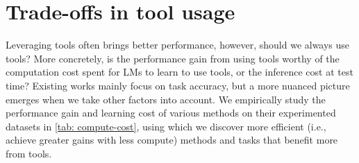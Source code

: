 \section{Trade-offs in tool usage}
\label{sub:trade-off}

Leveraging tools often brings better performance, however, should we always use tools? More concretely, is the performance gain from using tools worthy of the computation cost spent for LMs to learn to use tools, or the inference cost at test time?
Existing works mainly focus on task accuracy, but a more nuanced picture emerges when we take other factors into account.
We empirically study the performance gain and learning cost of various methods on their experimented datasets in \autoref{tab:   compute-cost}, using which we discover more efficient (i.e., achieve greater gains with less compute) methods and tasks that benefit more from tools.

